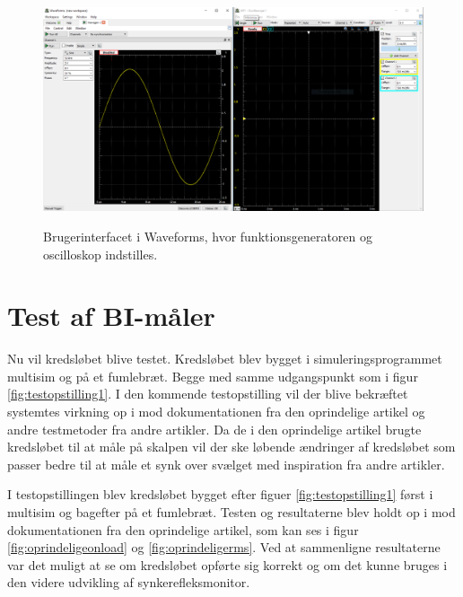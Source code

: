 \begin{figure}[H]
\centering
{\includegraphics[width=14cm]
{Figure/waveforms}}
\caption{Brugerinterfacet i Waveforms, hvor funktionsgeneratoren og oscilloskop indstilles. }
\label{fig:waveforms}
\end{figure}











\section{Test af BI-måler}

Nu vil kredsløbet blive testet. Kredsløbet blev bygget i simuleringsprogrammet multisim og på et fumlebræt. Begge med samme udgangspunkt som i figur \ref{fig:testopstilling1}. I den kommende testopstilling vil der blive bekræftet systemtes virkning op i mod dokumentationen fra den oprindelige artikel og andre testmetoder fra andre artikler. Da de i den oprindelige artikel brugte kredsløbet til at måle på skalpen vil der ske løbende ændringer af kredsløbet som passer bedre til at måle et synk over svælget med inspiration fra andre artikler. 





I testopstillingen blev kredsløbet bygget efter figuer \ref{fig:testopstilling1} først i multisim og bagefter på et fumlebræt. Testen og resultaterne blev holdt op i mod dokumentationen fra den oprindelige artikel, som kan ses i figur \ref{fig:oprindeligeonload} og \ref{fig:oprindeligerms}. Ved at sammenligne resultaterne var det muligt at se om kredsløbet opførte sig korrekt og om det kunne bruges i den videre udvikling af synkerefleksmonitor. 

